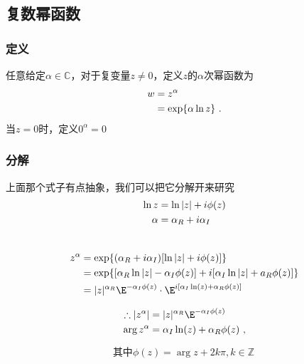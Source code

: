 
\begin{issues}
\issueDraft
\issueTODO
\end{issues}



\subsection{复数幂函数}

\subsubsection{定义}
任意给定$\alpha\in \mathbb{C}$，对于复变量$z\ne 0$，定义$z$的$\alpha$次幂函数为
\begin{align}
w&=z^\alpha\notag\\
&=\exp\{\alpha \ln z\}~.
\end{align}
当$z=0$时，定义$0^\alpha = 0$
\subsubsection{分解}
上面那个式子有点抽象，我们可以把它分解开来研究
\begin{align}
\ln z &= \ln |z|+i\phi(z)\notag\\
\alpha&=\alpha_R+i\alpha_I\notag\\~
\end{align}

\begin{align}
z^\alpha&=\exp\{(\alpha_R+i\alpha_I)[\ln |z|+i\phi(z)]\notag\}\\
&=\exp\{[\alpha_R \ln|z|-\alpha_I\phi (z)]+i[\alpha_I\ln|z|+a_R\phi(z)]\}\notag\\
&=|z|^{\alpha_R}\E^{-\alpha_I\phi(z)}\cdot \E^{i[\alpha_I\ln(z)+\alpha_R\phi(z)]}~
\end{align}

\begin{align}
\therefore |z^\alpha|&=|z|^{\alpha_R}\E^{-\alpha_I\phi(z)}\notag\\
\arg z^\alpha&=\alpha_I\ln(z)+\alpha_R\phi(z)\notag~,
\end{align}

\begin{equation}
\text{其中}\phi(z)=\arg z+2k\pi,k\in\mathbb Z~
\end{equation}



